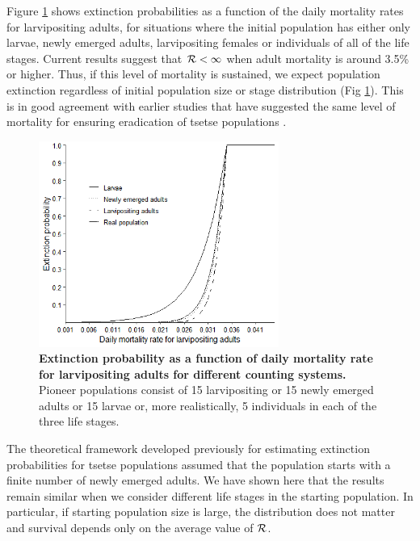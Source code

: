 \documentclass[smallextended]{svjour3}
\newcommand{\Rx}{\ensuremath{\cal R}}
\begin{document}
	Figure \ref{ExtLarviposMort15indiv} shows extinction probabilities as a function of the daily mortality rates for larvipositing adults, for situations where the initial population has either only larvae, newly emerged adults, larvipositing females or individuals of all of the life stages. Current results suggest that $\Rx<1$ when adult mortality is around 3.5\% or higher. Thus, if this level of mortality is sustained, we expect population extinction regardless of initial population size or stage distribution (Fig \ref{ExtLarviposMort15indiv}). This is in good agreement with earlier studies that have suggested the same level of mortality for ensuring eradication of tsetse populations \cite{Hargrove2005a,Kajunguri2019}.
	
	\begin{figure}[h]
		\includegraphics[width=0.7\textwidth]{Extinction15individuals.png}
		\caption{{\bf Extinction probability as a function of daily mortality rate for larvipositing adults for different counting systems.}  Pioneer populations consist of 15 larvipositing or 15 newly emerged adults or 15 larvae or, more realistically, 5 individuals in each of the three life stages.}
		
		\label{ExtLarviposMort15indiv}
	\end{figure}
	
	
	The theoretical framework developed previously for estimating extinction probabilities for tsetse populations assumed that the population starts with a finite number of newly emerged adults. We have shown here that the results remain similar when we consider different life stages in the starting population. In particular, if starting population size is large, the distribution does not matter and survival depends only on the average value of \Rx.  
	
\end{document}

